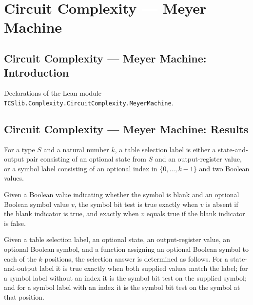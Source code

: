 \section{Circuit Complexity --- Meyer Machine}
\subsection*{Circuit Complexity --- Meyer Machine: Introduction}

Declarations of the Lean module \texttt{TCSlib.Complexity.CircuitComplexity.MeyerMachine}.

\subsection*{Circuit Complexity --- Meyer Machine: Results}

\begin{definition}
\label{Complexity.Meyer.TabSel}
\leanok
{}
For a type $S$ and a natural number $k$, a table selection label is either a
state-and-output pair consisting of an optional state from $S$ and an output-register
value, or a symbol label consisting of an optional index in $\{0,\ldots,k-1\}$ and two
Boolean values.
\end{definition}

\begin{definition}
\label{Complexity.Meyer.symBit}
\leanok
Given a Boolean value indicating whether the symbol is blank and an optional Boolean
symbol value $v$, the symbol bit test is true exactly when $v$ is absent if the blank
indicator is true, and exactly when $v$ equals true if the blank indicator is false.
\end{definition}

\begin{definition}
\label{Complexity.Meyer.selAnswer}
\leanok
{}
Given a table selection label, an optional state, an output-register value, an optional
Boolean symbol, and a function assigning an optional Boolean symbol to each of the $k$
positions, the selection answer is determined as follows. For a state-and-output label
it is true exactly when both supplied values match the label; for a symbol label without
an index it is the symbol bit test on the supplied symbol; and for a symbol label with
an index it is the symbol bit test on the symbol at that position.
\end{definition}

